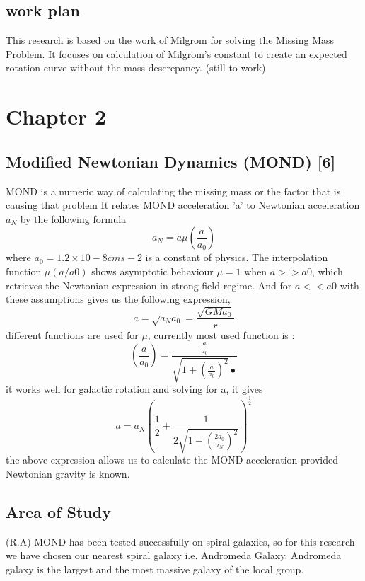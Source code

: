 \documentclass{article}
\begin{document}
\subsection{work plan}
 This research is based on the work of Milgrom for solving the Missing Mass Problem. It focuses on calculation of Milgrom's constant to create an expected rotation curve without the mass descrepancy. 
(still to work)

\section{Chapter 2}
\subsection{Modified Newtonian Dynamics (MOND) [6]}
MOND is a numeric way of calculating the missing mass or the factor that is causing that problem   It relates MOND acceleration 'a' to Newtonian acceleration $a_{N}$ by the following formula \begin{equation}
 a_{N}= a\mu(\frac{a}{a_{0}})
\end{equation}
where $a_{0} = 1.2×10-8  cms-2$  is a constant of physics. 
The interpolation function $\mu (a/a0)$ shows asymptotic behaviour $\mu=1$ when $a>> a0$,  which retrieves the Newtonian expression in strong field regime. And for $a << a0$ with these assumptions gives us the following expression, 
\begin{equation}
a= \sqrt{a_{N}a_{0}}= \frac{\sqrt{GMa_{0}}}{r}
\end{equation} 
different functions are used for $\mu$, currently most used function is :
\begin{equation}
(\frac{a}{a_{0}}) = \frac{\frac{a}{a_{0}}}{\sqrt{1+(\frac{a}{a_{0}})^2}•}
\end{equation} 
it works well for galactic rotation and solving for a, it gives 
\begin{equation}
a= a_{N}(\frac{1}{2}+\frac{1}{2\sqrt{1+(\frac{2a_{0}}{a_{N}})^2}})^\frac{1}{2}
\end{equation}
the above expression allows us to calculate the MOND acceleration provided Newtonian gravity is known. 
\subsection{Area of Study} (R.A)
  MOND has been tested successfully on spiral galaxies, so for this research we have chosen our nearest spiral galaxy i.e. Andromeda Galaxy. Andromeda galaxy is the largest and the most massive galaxy of the local group.
\end{document}
